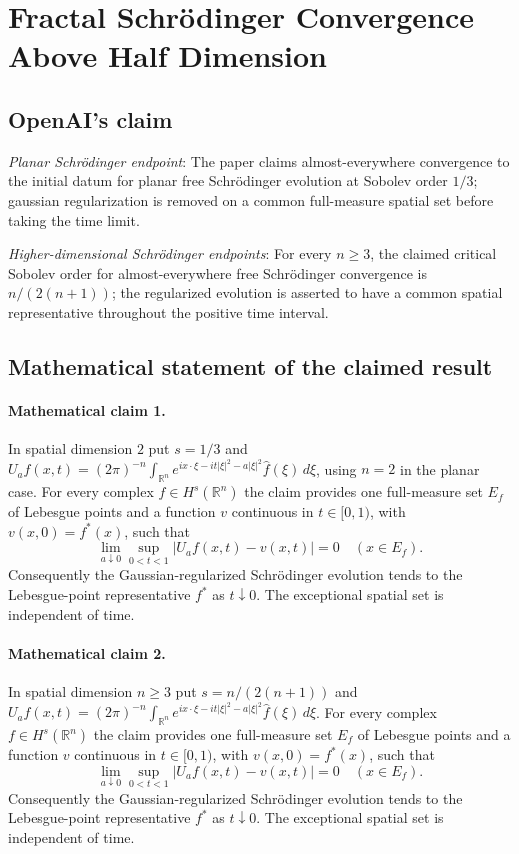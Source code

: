 \documentclass[11pt]{article}
\begin{document}
\section*{Fractal Schrödinger Convergence Above Half Dimension}

\subsection{OpenAI's claim}
\textit{Planar Schrödinger endpoint}: The paper claims almost-everywhere convergence to the initial datum for planar free Schrödinger evolution at Sobolev order $1/3$; gaussian regularization is removed on a common full-measure spatial set before taking the time limit.

\textit{Higher-dimensional Schrödinger endpoints}: For every $n\ge3$, the claimed critical Sobolev order for almost-everywhere free Schrödinger convergence is $n/(2(n+1))$; the regularized evolution is asserted to have a common spatial representative throughout the positive time interval.

\subsection{Mathematical statement of the claimed result}
\paragraph{Mathematical claim 1.} In spatial dimension $2$ put $s=1/3$ and $U_af(x,t)=(2\pi)^{-n}\int_{\mathbb R^n}e^{ix\cdot\xi-it|\xi|^2-a|\xi|^2}\widehat f(\xi)\,d\xi$, using $n=2$ in the planar case. For every complex $f\in H^s(\mathbb R^n)$ the claim provides one full-measure set $E_f$ of Lebesgue points and a function $v$ continuous in $t\in[0,1)$, with $v(x,0)=f^*(x)$, such that \[\lim_{a\downarrow0}\sup_{0<t<1}|U_af(x,t)-v(x,t)|=0\quad(x\in E_f).\] Consequently the Gaussian-regularized Schr\"odinger evolution tends to the Lebesgue-point representative $f^*$ as $t\downarrow0$. The exceptional spatial set is independent of time.

\paragraph{Mathematical claim 2.} In spatial dimension $n\ge3$ put $s=n/(2(n+1))$ and $U_af(x,t)=(2\pi)^{-n}\int_{\mathbb R^n}e^{ix\cdot\xi-it|\xi|^2-a|\xi|^2}\widehat f(\xi)\,d\xi$. For every complex $f\in H^s(\mathbb R^n)$ the claim provides one full-measure set $E_f$ of Lebesgue points and a function $v$ continuous in $t\in[0,1)$, with $v(x,0)=f^*(x)$, such that \[\lim_{a\downarrow0}\sup_{0<t<1}|U_af(x,t)-v(x,t)|=0\quad(x\in E_f).\] Consequently the Gaussian-regularized Schr\"odinger evolution tends to the Lebesgue-point representative $f^*$ as $t\downarrow0$. The exceptional spatial set is independent of time.
\end{document}
